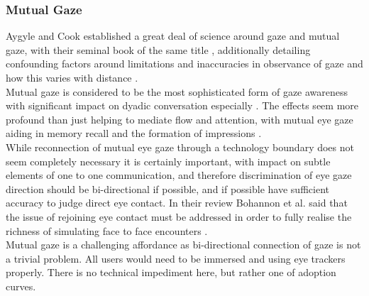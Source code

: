 \subsubsection{Mutual Gaze}
Aygyle and Cook established a great deal of science around gaze and mutual gaze, with their seminal book of the same title \cite{argyle1976gaze}, additionally detailing confounding factors around limitations and inaccuracies in observance of gaze and how this varies with distance \cite{Argyle1969} \cite{Argyle} \cite{Cook1977}.\\
Mutual gaze is considered to be the most sophisticated form of gaze awareness with significant impact on dyadic conversation especially \cite{Cook1977, Kleinke1986a, Fagel2010}. The effects seem more profound than just helping to mediate flow and attention, with mutual eye gaze aiding in memory recall and the formation of impressions \cite{Bohannon2013}.\\
While reconnection of mutual eye gaze through a technology boundary does not seem completely necessary it is certainly important, with impact on subtle elements of one to one communication, and therefore discrimination of eye gaze direction should be bi-directional if possible, and if possible have sufficient accuracy to judge direct eye contact. In their review Bohannon et al. said that the issue of rejoining eye contact must be addressed in order to fully realise the richness of simulating face to face encounters \cite{Bohannon2013}.\\
Mutual gaze is a challenging affordance as bi-directional connection of gaze is not a trivial problem. All users would need to be immersed and using eye trackers properly. There is no technical impediment here, but rather one of adoption curves.
